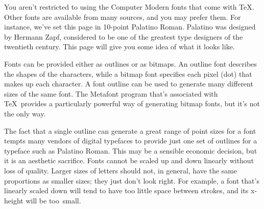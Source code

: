 You aren't restricted to using the Computer Modern fonts that
come with \TeX.  Other fonts are available from many sources,
and you may prefer them.  For instance, we've set this page
in 10-point Palatino Roman. Palatino was designed by
Hermann Zapf, considered to be one of the greatest type
designers of the twentieth century.  This page will
give you some idea of what it looks like.

Fonts can be provided either as outlines or as bitmaps.  An
outline font describes the shapes of the characters, while a
bitmap font specifies each pixel (dot) that makes up each
character.  A font outline can be used to generate many
different sizes of the same font.  The Metafont program
that's associated with \TeX\  provides a particularly
powerful way of generating bitmap fonts, but it's not the
only way.

The fact that a single outline can generate a great range of
point sizes for a font tempts many vendors of digital
typefaces to provide just one set of outlines for a typeface
such as Palatino Roman.  This may be a sensible economic
decision, but it is an aesthetic sacrifice.  Fonts cannot be
scaled up and down linearly without loss of quality. 
Larger sizes of letters should not, in general, have the
same proportions as smaller sizes; they just don't look
right.  For example, a font that's linearly scaled down will
tend to have too little space between strokes, and its
x-height will be too~small. %

